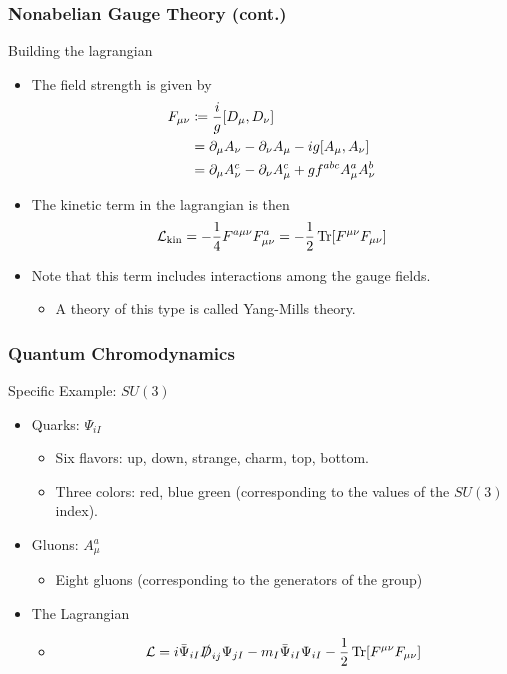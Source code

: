 \documentclass{beamer}
\begin{document}
\begin{frame}
    \frametitle{Nonabelian Gauge Theory (cont.)}
    \alert{Building the lagrangian}
    \begin{itemize}
        \item[\textbullet]<2-> The field strength is given by
        \begin{align*}
            F_{\mu\nu} &\coloneqq \frac{i}{g}\comm{D_\mu}{D_\nu} \\
            &= \partial_\mu A_\nu - \partial_\nu A_\mu - ig\comm{A_\mu}{A_\nu} \\
            &= \partial_\mu A_\nu^c - \partial_\nu A_\mu^c + gf^{abc}A_\mu^a A_\nu^b
        \end{align*}
        \item[\textbullet]<3-> The kinetic term in the lagrangian is then \[ \mathcal{L}_{\text{kin}} = -\frac{1}{4}F^{a\mu\nu}F_{\mu\nu}^a = -\frac{1}{2}\Tr[F^{\mu\nu}F_{\mu\nu}] \]
        \item[\textbullet]<4-> Note that this term includes interactions among the gauge fields.
        \begin{itemize}
            \item[\textbullet]<5-> A theory of this type is called Yang-Mills theory.
        \end{itemize}
    \end{itemize}
\end{frame}

\begin{frame}
    \frametitle{Quantum Chromodynamics}
    \alert{Specific Example: $SU(3)$}
    \begin{itemize}
        \item[\textbullet]<2-> Quarks: $\Psi_{iI}$
        \begin{itemize}
            \item[\textbullet]<3-> Six flavors: up, down, strange, charm, top, bottom.
            \item[\textbullet]<4-> Three colors: red, blue green (corresponding to the values of the $SU(3)$ index).
        \end{itemize}
        \item[\textbullet]<5-> Gluons: $A_\mu^a$
        \begin{itemize}
            \item Eight gluons (corresponding to the generators of the group)
        \end{itemize}
        \item[\textbullet]<6-> The Lagrangian
        \begin{itemize}
            \item<7-> \[ \mathcal{L} = i\bar{\Psi}_{iI}\slashed{D}_{ij}\Psi_{jI} - m_I\bar{\Psi}_{iI}\Psi_{iI} - \frac{1}{2}\Tr[F^{\mu\nu}F_{\mu\nu}] \]
        \end{itemize}
    \end{itemize}
\end{frame}
\end{document}
